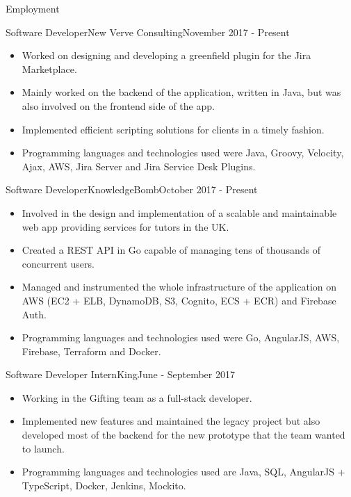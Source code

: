 \documentclass[]{cv}
\begin{document}
	\makeheader
	
	\begin{cvsection}{Employment}
		\begin{cvsubsection}{Software Developer}{New Verve Consulting}{November 2017 - Present}
			\begin{itemize}
				\item Worked on designing and developing a greenfield plugin for the Jira Marketplace.
				\item Mainly worked on the backend of the application, written in Java, but was also involved 
				on the frontend side of the app.
				\item Implemented efficient scripting solutions for clients in a timely fashion.
				\item Programming languages and technologies used were Java, Groovy, Velocity, Ajax, AWS, 
				Jira Server and Jira Service Desk Plugins.
			\end{itemize}
		\end{cvsubsection}
		
		\begin{cvsubsection}{Software Developer}{KnowledgeBomb}{October 2017 - Present}	
			\begin{itemize}
				\item Involved in the design and implementation of a scalable and maintainable web app 
				providing services for tutors in the UK.
				\item Created a REST API in Go capable of managing tens of thousands of concurrent users.
				\item Managed and instrumented the whole infrastructure of the application on AWS (EC2 + ELB, DynamoDB, S3, Cognito, ECS + ECR)
				and Firebase Auth.
				\item Programming languages and technologies used were Go, AngularJS, AWS, Firebase, Terraform and Docker.
			\end{itemize}
		\end{cvsubsection}
		
		\begin{cvsubsection}{Software Developer Intern}{King}{June - September 2017}		
			\begin{itemize}
				\item Working in the Gifting team as a full-stack developer.
				\item Implemented new features and maintained the legacy project but also developed most of the backend for the new prototype that the team wanted to launch.
				\item Programming languages and technologies used are Java, SQL, AngularJS + TypeScript, Docker, Jenkins, Mockito.
			\end{itemize}
		\end{cvsubsection}
		

\end{cvsection}
\end{document}
